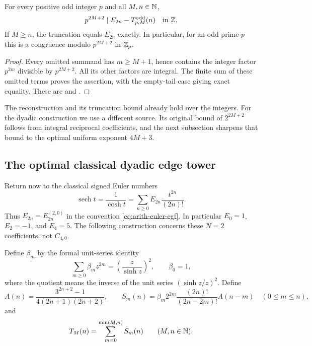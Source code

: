 \begin{corollary}\label{cor:arith-odd-ladder}
For every positive odd integer $p$ and all $M,n\in\mathbb N$,
\[
 p^{2M+2}\mid E_{2n}-T^{\mathrm{odd}}_{p,M}(n)\quad\text{in }\mathbb Z.
\]
If $M\ge n$, the truncation equals $E_{2n}$ exactly.  In particular,
for an odd prime $p$ this is a congruence modulo $p^{2M+2}$ in $\mathbb Z_p$.
\end{corollary}

\begin{proof}
Every omitted summand has $m\ge M+1$, hence contains the integer factor
$p^{2m}$ divisible by $p^{2M+2}$.  All its other factors are integral.
The finite sum of these omitted terms proves the assertion, with the
empty-tail case giving exact equality.  These are
 and
.
\end{proof}

The reconstruction and its truncation bound already hold over the integers.
For the dyadic construction we use a different source.  Its original bound
of $2^{2M+2}$ follows from integral reciprocal coefficients, and the next
subsection sharpens that bound to the optimal uniform exponent $4M+3$.

\subsection{The optimal classical dyadic edge tower}

Return now to the classical signed Euler numbers
\[
 \operatorname{sech}t=\frac1{\cosh t}
       =\sum_{n\ge0}E_{2n}\frac{t^{2n}}{(2n)!}.
\]
Thus $E_{2n}=E_{2n}^{(2,0)}$ in the convention
\eqref{eq:arith-euler-egf}.  In particular $E_0=1$, $E_2=-1$, and $E_4=5$.
The following construction concerns these $N=2$ coefficients, not $C_{4,0}$.

\begin{definition}\label{def:arith-truncation}
Define $\beta_m$ by the formal unit-series identity
\[
 \sum_{m\ge0}\beta_m z^{2m}=\left(\frac{z}{\sinh z}\right)^2,
 \qquad \beta_0=1,
\]
where the quotient means the inverse of the unit series
$(\sinh z/z)^2$.  Define
\[
 A(n)=\frac{3^{2n+2}-1}{4(2n+1)(2n+2)},\qquad
 S_m(n)=\beta_m2^{2m}\frac{(2n)!}{(2n-2m)!}A(n-m)
       \quad(0\le m\le n),
\]
and
\begin{equation}\label{eq:arith-tm}
 T_M(n)=\sum_{m=0}^{\min(M,n)}S_m(n)\qquad(M,n\in\mathbb N).
\end{equation}
\end{definition}

